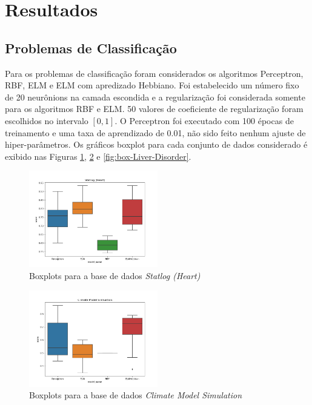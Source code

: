 \documentclass[conference]{IEEEtran}
\begin{document}
	\section{Resultados}
	
	\subsection{Problemas de Classificação}
	Para os problemas de classificação foram considerados os algoritmos Perceptron, RBF, ELM e ELM com apredizado Hebbiano. Foi estabelecido um número fixo de 20 neurônions na camada escondida e a regularização foi considerada somente para os algoritmos RBF e ELM. 50 valores de coeficiente de regularização foram escolhidos no intervalo $[0,1]$. O Perceptron foi executado com 100 épocas de treinamento e uma taxa de aprendizado de 0.01, não sido feito nenhum ajuste de hiper-parâmetros. Os gráficos boxplot para cada conjunto de dados considerado é exibido nas Figuras \ref{fig:box-statlog-heart}, \ref{fig:box-Climate-Model-Simluation} e \ref{fig:box-Liver-Disorder}.
	
	\begin{figure}[thpbh]
		\centering
		\includegraphics[width=0.5\textwidth]{figures/Statlog (Heart)_scores.png}
		\caption{Boxplots para a base de dados \textit{Statlog (Heart)}}
		\label{fig:box-statlog-heart}
	\end{figure}

	\begin{figure}[thpbh]
		\centering
		\includegraphics[width=0.5\textwidth]{figures/Climate Model Simluation_scores.png}
		\caption{Boxplots para a base de dados \textit{Climate Model Simulation}}
		\label{fig:box-Climate-Model-Simluation}
	\end{figure}
\end{document}
